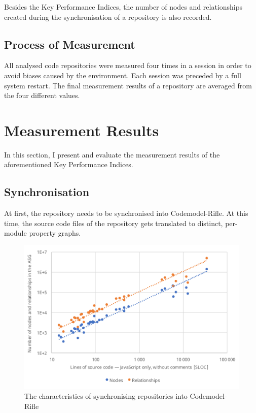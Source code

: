 Besides the Key Performance Indices, the number of nodes and relationships created during the synchronisation of a repository is also recorded.


\subsection{Process of Measurement}

All analysed code repositories were measured four times in a session in order to avoid biases caused by the environment. Each session was preceded by a full system restart. The final measurement results of a repository are averaged from the four different values.


\section{Measurement Results}

In this section, I present and evaluate the measurement results of the aforementioned Key Performance Indices.



\subsection{Synchronisation}

At first, the repository needs to be synchronised into Codemodel-Rifle. At this time, the source code files of the repository gets translated to distinct, per-module property graphs.

\begin{figure}[!htb]
	\centerfloat
	\includegraphics[width=\textwidth,clip]{figures/measurement-nodes-relationships-sloc.pdf}
	\caption{The characteristics of synchronising repositories into Codemodel-Rifle}
	\label{fig:measurement-nodes-relationships-sloc}
\end{figure}

